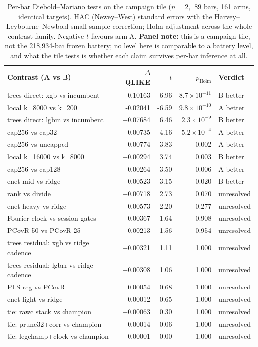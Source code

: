 \begin{table}[H]
\centering
\caption{Per-bar Diebold--Mariano tests on the campaign tile ($n = 2,189$ bars, 161 arms, identical targets). HAC (Newey--West) standard errors with the
Harvey--Leybourne--Newbold small-sample correction; Holm adjustment across
the whole contrast family. Negative $t$ favours arm A. \textbf{Panel note:}
this is a campaign tile, not the 218{,}934-bar frozen battery; no level here
is comparable to a battery level, and what the tile tests is whether each
claim survives per-bar inference at all.}
\label{tab:tile_dm}
\footnotesize
\begin{tabular}{lrrrl}
\toprule
Contrast (A vs B) & $\Delta$QLIKE & $t$ & $p_{\text{Holm}}$ & Verdict \\
\midrule
trees direct: xgb vs incumbent & +0.10163 & 6.96 & $8.7\times 10^{-11}$ & B better \\
local k=8000 vs k=200 & -0.02041 & -6.59 & $9.8\times 10^{-10}$ & A better \\
trees direct: lgbm vs incumbent & +0.07684 & 6.46 & $2.3\times 10^{-9}$ & B better \\
cap256 vs cap32 & -0.00735 & -4.16 & $5.2\times 10^{-4}$ & A better \\
cap256 vs uncapped & -0.00774 & -3.83 & 0.002 & A better \\
local k=16000 vs k=8000 & +0.00294 & 3.74 & 0.003 & B better \\
cap256 vs cap128 & -0.00264 & -3.50 & 0.006 & A better \\
enet mid vs ridge & +0.00523 & 3.15 & 0.020 & B better \\
rank vs divide & +0.00718 & 2.73 & 0.070 & unresolved \\
enet heavy vs ridge & +0.00573 & 2.20 & 0.277 & unresolved \\
Fourier clock vs session gates & -0.00367 & -1.64 & 0.908 & unresolved \\
PCovR-50 vs PCovR-25 & -0.00213 & -1.56 & 0.954 & unresolved \\
trees residual: xgb vs ridge cadence & +0.00321 & 1.11 & 1.000 & unresolved \\
trees residual: lgbm vs ridge cadence & +0.00308 & 1.06 & 1.000 & unresolved \\
PLS reg vs PCovR & +0.00054 & 0.68 & 1.000 & unresolved \\
enet light vs ridge & -0.00012 & -0.65 & 1.000 & unresolved \\
tie: rawc stack vs champion & +0.00063 & 0.30 & 1.000 & unresolved \\
tie: prune32+corr vs champion & +0.00014 & 0.06 & 1.000 & unresolved \\
tie: legchamp+clock vs champion & +0.00001 & 0.00 & 1.000 & unresolved \\
\bottomrule
\end{tabular}
\end{table}
